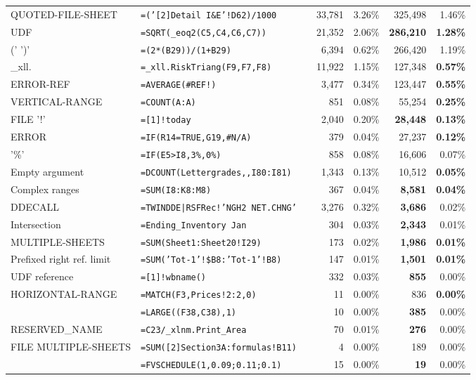 \begin{tabular}{llrrrrr}
			QUOTED-FILE-SHEET & \texttt{=('[2]Detail I\&E'!D62)/1000} &  & 33,781 & 3.26\% & 325,498 & 1.46\%\\
			UDF & \texttt{=SQRT(_eoq2(C5,C4,C6,C7))} &  & 21,352 & 2.06\% & \textbf{286,210} & \textbf{1.28\%}\\
			(' \synt{Reference} ')' & \texttt{=(2*(B29))/(1+B29)} &  & 6,394 & 0.62\% & 266,420 & 1.19\%\\
			_xll. & \texttt{=_xll.RiskTriang(F9,F7,F8)} &  & 11,922 & 1.15\% & 127,348 & \textbf{0.57\%}\\
			ERROR-REF & \texttt{=AVERAGE(\#REF!)} &  & 3,477 & 0.34\% & 123,447 & \textbf{0.55\%}\\
			VERTICAL-RANGE & \texttt{=COUNT(A:A)} &  & 851 & 0.08\% & 55,254 & \textbf{0.25\%}\\
			FILE '!' & \texttt{=[1]!today} &  & 2,040 & 0.20\% & \textbf{28,448} & \textbf{0.13\%}\\
			ERROR & \texttt{=IF(R14=TRUE,G19,\#N/A)} &  & 379 & 0.04\% & 27,237 & \textbf{0.12\%}\\
			'\%' & \texttt{=IF(E5>I8,3\%,0\%)} &  & 858 & 0.08\% & 16,606 & 0.07\%\\
				Empty argument & \texttt{=DCOUNT(Lettergrades,,I80:I81)} &  & 1,343 & 0.13\% & 10,512 & \textbf{0.05\%}\\
				Complex ranges & \texttt{=SUM(I8:K8:M8)} &  & 367 & 0.04\% & \textbf{8,581} & \textbf{0.04\%}\\
				DDECALL & \texttt{=TWINDDE|RSFRec!'NGH2 NET.CHNG'} &  & 3,276 & 0.32\% & \textbf{3,686} & 0.02\%\\
				Intersection & \texttt{=Ending_Inventory Jan} &  & 304 & 0.03\% & \textbf{2,343} & 0.01\%\\
				MULTIPLE-SHEETS & \texttt{=SUM(Sheet1:Sheet20!I29)} &  & 173 & 0.02\% & \textbf{1,986} & \textbf{0.01\%}\\
				Prefixed right ref. limit & \texttt{=SUM('Tot-1'!\$B8:'Tot-1'!B8)} &  & 147 & 0.01\% & \textbf{1,501} & \textbf{0.01\%}\\
				UDF reference & \texttt{=[1]!wbname()} &  & 332 & 0.03\% & \textbf{855} & 0.00\%\\
				HORIZONTAL-RANGE & \texttt{=MATCH(F3,Prices!2:2,0)} &  & 11 & 0.00\% & 836 & \textbf{0.00\%}\\
				\synt{Union} & \texttt{=LARGE((F38,C38),1)} &  & 10 & 0.00\% & \textbf{385} & 0.00\%\\
				RESERVED_NAME & \texttt{=C23/_xlnm.Print_Area} &  & 70 & 0.01\% & \textbf{276} & 0.00\%\\
				FILE MULTIPLE-SHEETS & \texttt{=SUM([2]Section3A:formulas!B11)} &  & 4 & 0.00\% & 189 & 0.00\%\\
				\synt{ConstantArray} & \texttt{=FVSCHEDULE(1,{0.09;0.11;0.1})} &  & 15 & 0.00\% & \textbf{19} & 0.00\%\\
			\hline
	\end{tabular}
